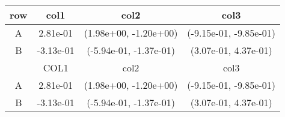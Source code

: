 \begin{tabular}{cccc}
\toprule
row&col1&col2&col3\tabularnewline
\midrule
A&2.81e-01& (1.98e+00, -1.20e+00)& (-9.15e-01, -9.85e-01)\tabularnewline
B&-3.13e-01& (-5.94e-01, -1.37e-01)& (3.07e-01, 4.37e-01)\tabularnewline
\midrule
&COL1&col2&col3\tabularnewline
\midrule
A&2.81e-01& (1.98e+00, -1.20e+00)& (-9.15e-01, -9.85e-01)\tabularnewline
B&-3.13e-01& (-5.94e-01, -1.37e-01)& (3.07e-01, 4.37e-01)\tabularnewline
\bottomrule
\end{tabular}

